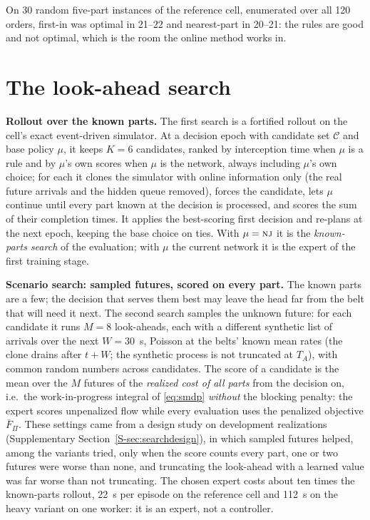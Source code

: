 \documentclass[11pt,a4paper]{article}
\theoremstyle{plain}
\theoremstyle{definition}
\theoremstyle{remark}
\newcommand{\nj}{\textsc{nj}}
\newcommand{\Fpi}{\overline F_\Pi}
\newcommand{\Supp}[1]{Supplementary Section~\ref{S-#1}}
\begin{document}
On 30 random five-part instances of the reference cell, enumerated over all 120 orders,
first-in was optimal in 21--22 and nearest-part in 20--21: the rules are good and not
optimal, which is the room the online method works in.

\section{The look-ahead search}\label{sec:search}
\textbf{Rollout over the known parts.} The first search is a fortified rollout
\cite{M02_Bertsekas1997} on the cell's exact event-driven simulator. At a decision epoch
with candidate set $\mathcal C$ and base policy $\mu$, it keeps $K=6$ candidates, ranked by
interception time when $\mu$ is a rule and by $\mu$'s own scores when $\mu$ is the network,
always including $\mu$'s own choice; for each it clones the simulator with online
information only (the real future arrivals and the hidden queue removed), forces the
candidate, lets $\mu$ continue until every part known at the decision is processed, and
scores the sum of their completion times. It applies the best-scoring first decision and
re-plans at the next epoch, keeping the base choice on ties. With $\mu=\nj$ it is the
\emph{known-parts search} of the evaluation; with $\mu$ the current network it is the expert
of the first training stage.

\textbf{Scenario search: sampled futures, scored on every part.} The known parts are a few;
the decision that serves them best may leave the head far from the belt that will need it
next. The second search samples the unknown future: for each candidate it runs $M=8$
look-aheads, each with a different synthetic list of arrivals over the next $W=30$~s,
Poisson at the belts' known mean rates (the clone drains after $t+W$; the synthetic process
is not truncated at $T_A$), with common random numbers across candidates. The score of a
candidate is the mean over the $M$ futures of the \emph{realized cost of all parts} from the
decision on, i.e.\ the work-in-progress integral of \eqref{eq:smdp} \emph{without} the
blocking penalty: the expert scores unpenalized flow while every evaluation uses the
penalized objective $\Fpi$. These settings came from a design study on development
realizations (\Supp{sec:searchdesign}), in which sampled futures helped, among the variants tried, only
when the score counts every part, one or two futures were worse than none, and truncating the look-ahead
with a learned value was far worse than not truncating. The chosen expert costs about ten
times the known-parts rollout, 22~s per episode on the reference cell and 112~s on the
heavy variant on one worker: it is an expert, not a controller.
\end{document}
